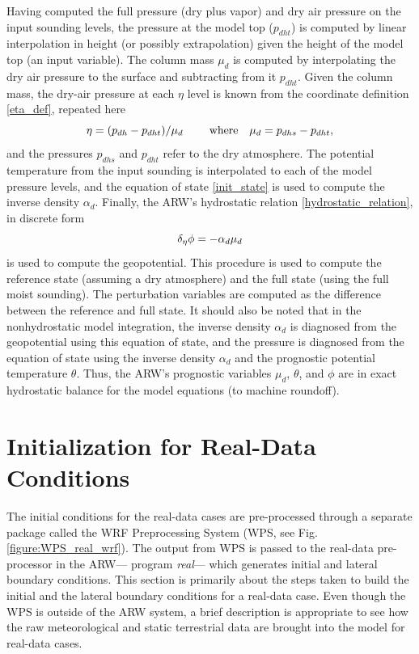 Having computed the full pressure (dry plus vapor) and dry air pressure
on the input sounding levels, the pressure at the model top ($p_{dht}$)
is computed by linear interpolation in height (or possibly
extrapolation) given the height of the model top (an input variable).
The column mass $\mu_d$ is computed by interpolating the dry air
pressure to the surface and subtracting from it $p_{dht}$.  Given the
column mass, the dry-air pressure at each $\eta$ level is known from the
coordinate definition \eqref{eta_def}, repeated here
%
\begin{equation}
\eta = (p_{dh}-p_{dht})/\mu_d ~~~~~~~{\rm where
                              }~~~ \mu_d = p_{dhs}-p_{dht},
\notag
\end{equation}
%
\noindent
and the pressures $p_{dhs}$ and $p_{dht}$ refer to the dry atmosphere.
The potential
temperature from the input sounding is interpolated to
each of the model pressure levels, and the equation of state
\eqref{init_state} is used to compute the inverse density 
$\alpha_d$.  Finally, the 
ARW's hydrostatic relation \eqref{hydrostatic_relation},
in discrete form
%
\begin{equation}
\delta_\eta \phi = - \alpha_d \mu_d
\notag
\end{equation}
\noindent
is used to compute the geopotential.  This procedure is used to compute
the reference state (assuming a dry atmosphere) and the full state
(using the full moist sounding).  The perturbation variables are
computed as the difference between the reference and full state.  It
should also be noted that in the nonhydrostatic model integration,
the inverse density $\alpha_d$ is diagnosed from the geopotential using
this equation of state, and the pressure is diagnosed from the equation
of state using the inverse density $\alpha_d$ and the prognostic potential
temperature $\theta$.  Thus, the ARW's prognostic variables $\mu_d$,
$\theta$, and $\phi$ are in exact hydrostatic balance for the model
equations (to machine roundoff).

\section{Initialization for Real-Data Conditions}

The initial conditions for the real-data cases are pre-processed through a separate 
package called the WRF Preprocessing System (WPS, see Fig. \ref{figure:WPS_real_wrf}).  
The output from WPS is passed to the 
real-data pre-processor in the ARW--- program {\it real}--- which generates initial and lateral boundary
conditions.  This section is primarily about the steps taken to build the
initial and the lateral boundary conditions for a real-data case.  Even though the
WPS is outside of the ARW system, a brief description is appropriate to see how the 
raw meteorological and static terrestrial data are brought into the model
for real-data cases.

